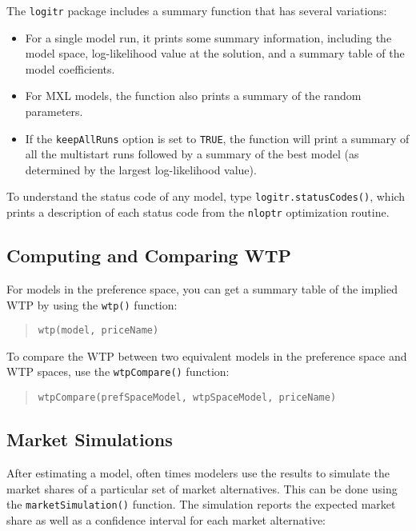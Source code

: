 \documentclass[article]{jss}
\providecommand{\tightlist}{%
  \setlength{\itemsep}{0pt}\setlength{\parskip}{0pt}}
\begin{document}
The \texttt{logitr} package includes a summary function that has several
variations:

\begin{itemize}
\tightlist
\item
  For a single model run, it prints some summary information, including
  the model space, log-likelihood value at the solution, and a summary
  table of the model coefficients.
\item
  For MXL models, the function also prints a summary of the random
  parameters.
\item
  If the \texttt{keepAllRuns} option is set to \texttt{TRUE}, the
  function will print a summary of all the multistart runs followed by a
  summary of the best model (as determined by the largest log-likelihood
  value).
\end{itemize}

To understand the status code of any model, type
\texttt{logitr.statusCodes()}, which prints a description of each status
code from the \texttt{nloptr} optimization routine.

\hypertarget{computing-and-comparing-wtp}{%
\subsection{Computing and Comparing
WTP}\label{computing-and-comparing-wtp}}

For models in the preference space, you can get a summary table of the
implied WTP by using the \texttt{wtp()} function:

\begin{quote}
\texttt{wtp(model,\ priceName)}
\end{quote}

To compare the WTP between two equivalent models in the preference space
and WTP spaces, use the \texttt{wtpCompare()} function:

\begin{quote}
\texttt{wtpCompare(prefSpaceModel,\ wtpSpaceModel,\ priceName)}
\end{quote}

\hypertarget{market-simulations}{%
\subsection{Market Simulations}\label{market-simulations}}

After estimating a model, often times modelers use the results to
simulate the market shares of a particular set of market alternatives.
This can be done using the \texttt{marketSimulation()} function. The
simulation reports the expected market share as well as a confidence
interval for each market alternative:
\end{document}
